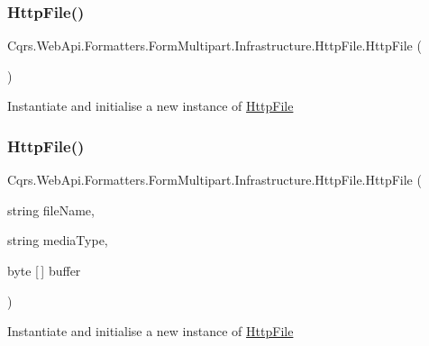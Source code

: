 \subsubsection{\texorpdfstring{Http\+File()}{HttpFile()}\hspace{0.1cm}{\footnotesize\ttfamily [1/2]}}
{\footnotesize\ttfamily Cqrs.\+Web\+Api.\+Formatters.\+Form\+Multipart.\+Infrastructure.\+Http\+File.\+Http\+File (\begin{DoxyParamCaption}{ }\end{DoxyParamCaption})}



Instantiate and initialise a new instance of \hyperlink{classCqrs_1_1WebApi_1_1Formatters_1_1FormMultipart_1_1Infrastructure_1_1HttpFile}{Http\+File} 

\mbox{\label{classCqrs_1_1WebApi_1_1Formatters_1_1FormMultipart_1_1Infrastructure_1_1HttpFile_a725fbc81d5a60e8a85f4cf789907b934_a725fbc81d5a60e8a85f4cf789907b934}} 
\subsubsection{\texorpdfstring{Http\+File()}{HttpFile()}\hspace{0.1cm}{\footnotesize\ttfamily [2/2]}}
{\footnotesize\ttfamily Cqrs.\+Web\+Api.\+Formatters.\+Form\+Multipart.\+Infrastructure.\+Http\+File.\+Http\+File (\begin{DoxyParamCaption}\item[{string}]{file\+Name,  }\item[{string}]{media\+Type,  }\item[{byte \mbox{[}$\,$\mbox{]}}]{buffer }\end{DoxyParamCaption})}



Instantiate and initialise a new instance of \hyperlink{classCqrs_1_1WebApi_1_1Formatters_1_1FormMultipart_1_1Infrastructure_1_1HttpFile}{Http\+File} 



